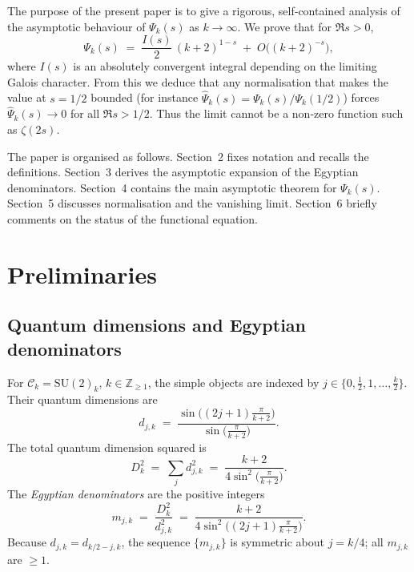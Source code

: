 \documentclass[11pt,a4paper]{article}
\theoremstyle{definition}
\theoremstyle{remark}
\begin{document}
The purpose of the present paper is to give a rigorous, self‑contained analysis of the asymptotic behaviour of $\Psi_k(s)$ as $k\to\infty$.
We prove that for $\Re s>0$,
\[
\Psi_k(s) \;=\; \frac{I(s)}{2}\,(k+2)^{1-s}\;+\;O\!\bigl((k+2)^{-s}\bigr),
\]
where $I(s)$ is an absolutely convergent integral depending on the limiting Galois character.
From this we deduce that any normalisation that makes the value at $s=1/2$ bounded (for instance $\widehat\Psi_k(s)=\Psi_k(s)/\Psi_k(1/2)$) forces $\widehat\Psi_k(s)\to0$ for all $\Re s>1/2$.
Thus the limit cannot be a non‑zero function such as $\zeta(2s)$.

The paper is organised as follows.
Section~2 fixes notation and recalls the definitions.
Section~3 derives the asymptotic expansion of the Egyptian denominators.
Section~4 contains the main asymptotic theorem for $\Psi_k(s)$.
Section~5 discusses normalisation and the vanishing limit.
Section~6 briefly comments on the status of the functional equation.

\section{Preliminaries}

\subsection{Quantum dimensions and Egyptian denominators}
For $\mathcal{C}_k=\mathrm{SU}(2)_k$, $k\in\mathbb Z_{\ge1}$, the simple objects are indexed by
$j\in\{0,\tfrac12,1,\dots,\tfrac{k}{2}\}$.
Their quantum dimensions are
\begin{equation}\label{eq:qdim}
d_{j,k} \;=\; \frac{\sin\bigl((2j+1)\frac{\pi}{k+2}\bigr)}
                 {\sin\bigl(\frac{\pi}{k+2}\bigr)} .
\end{equation}
The total quantum dimension squared is
\begin{equation}\label{eq:D2}
D_k^2 \;=\; \sum_{j} d_{j,k}^2
        \;=\; \frac{k+2}{4\sin^2\!\bigl(\frac{\pi}{k+2}\bigr)} .
\end{equation}
The \emph{Egyptian denominators} are the positive integers
\begin{equation}\label{eq:m}
m_{j,k} \;=\; \frac{D_k^2}{d_{j,k}^2}
        \;=\; \frac{k+2}{4\sin^2\!\bigl((2j+1)\frac{\pi}{k+2}\bigr)} .
\end{equation}
Because $d_{j,k}=d_{k/2-j,k}$, the sequence $\{m_{j,k}\}$ is symmetric about $j=k/4$;
all $m_{j,k}$ are $\ge1$.
\end{document}
